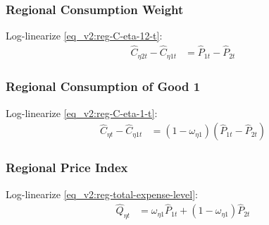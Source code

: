 \documentclass[../thesis.tex]{subfiles}
\begin{document}
\subsubsection*{Regional Consumption Weight}

Log-linearize \ref{eq_v2:reg-C-eta-12-t}:
\begin{align}
	\hat{C}_{\eta 2t} - \hat{C}_{\eta 1t} &= \hat{P}_{1t} - \hat{P}_{2t} \label{eq_v2:reg-C-eta-12-t-ll}
\end{align}

\subsubsection*{Regional Consumption of Good 1}

Log-linearize \ref{eq_v2:reg-C-eta-1-t}:
\begin{align}
	\hat{C}_{\eta t} - \hat{C}_{\eta 1 t} &= (1 - \omega_{\eta 1}) (\hat{P}_{1t} - \hat{P}_{2t}) \label{eq_v2:reg-C-eta-1-t-ll}
\end{align}


\subsubsection*{Regional Price Index}

Log-linearize \ref{eq_v2:reg-total-expense-level}:
\begin{align}
	\hat{Q}_{\eta t} &= \omega_{\eta 1} \hat{P}_{1 t} + (1 -\omega_{\eta 1}) \hat{P}_{2 t} \label{eq_v2:reg-total-expense-level-ll}
\end{align}

\begin{comment}
	\subsubsection*{Regional Terms of Trade}
	
	Log-linearize \ref{eq_v2:reg-total-expense-level-2}:
	\begin{align}
		\hat{Q}_{1t} &= \hat{Q}_{2t} \label{eq_v2:reg-total-expense-level-2-ll}
	\end{align}
\end{comment}

\end{document}
